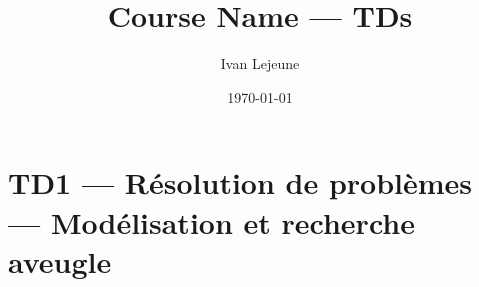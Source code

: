 \documentclass[french,a4paper,10pt]{article}
\title{\color{astral} \sffamily \bfseries Course Name --- TDs}
\author{Ivan Lejeune}
\date{\today}
\begin{document}
    \maketitle
    \tableofcontents

    \newpage
    \section*{TD1 --- Résolution de problèmes --- Modélisation et recherche aveugle}\label{sec:TD1}
    \setcounter{section}{1}
    \setcounter{tdcounter}{0}
    

\end{document}
